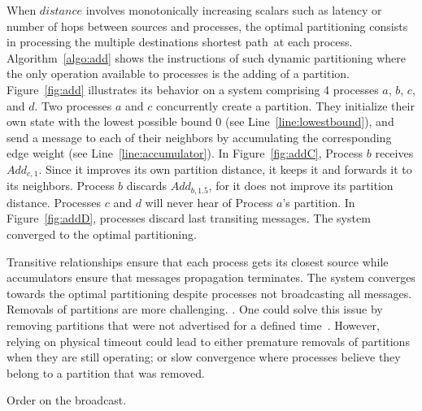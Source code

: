 \begin{algorithm}
  
  \caption{\label{algo:add}Adding a partition by Process $p$.}
\end{algorithm}

When $distance$ involves monotonically increasing scalars such as
latency or number of hops between sources and processes, the optimal
partitioning consists in processing the multiple destinations shortest
path~\REF at each process.  Algorithm~\ref{algo:add} shows the
instructions of such dynamic partitioning where the only operation
available to processes is the adding of a
partition. Figure~\ref{fig:add} illustrates its behavior on a system
comprising 4 processes $a$, $b$, $c$, and $d$. Two processes $a$ and
$c$ concurrently create a partition. They initialize their own state
with the lowest possible bound $0$ (see Line~\ref{line:lowestbound}),
and send a message to each of their neighbors by accumulating the
corresponding edge weight (see Line~\ref{line:accumulator}). In
Figure~\ref{fig:addC}, Process $b$ receives $Add_{c, 1}$. Since it
improves its own partition distance, it keeps it and forwards it to
its neighbors. Process $b$ discards $Add_{b, 1.5}$, for it does not
improve its partition distance. Processes $c$ and $d$ will never hear
of Process $a$'s partition. In Figure~\ref{fig:addD}, processes
discard last transiting messages. The system converged to the optimal
partitioning. 

Transitive relationships ensure that each process gets its closest
source while accumulators ensure that messages propagation
terminates. The system converges towards the optimal partitioning
despite processes not broadcasting all messages. Removals of
partitions are more challenging.  . One could solve this
issue by removing partitions that were not advertised for a defined
time~\REF. However, relying on physical timeout could lead to either
premature removals of partitions when they are still operating; or
slow convergence where processes believe they belong to a partition
that was removed.


\begin{figure*}
  \begin{center}
    \subfloat[Part A][\label{fig:delA}Both Process $a$ and
      Process $c$ initiate then remove a partition.
      $w_{ab} = 1.5$; $w_{bc} = w_{cd} = w_{bd} = 1$.]{}
    \hspace{5pt}
    \hspace{5pt}
    \hspace{5pt}

  \end{center}
  \caption{\label{algo:add}Removing partition may lead to inconsistent states.}
\end{figure*}



Order on the broadcast.





